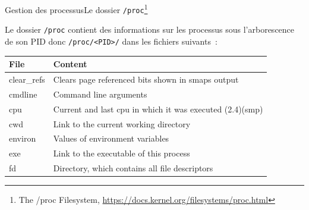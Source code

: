 \documentclass{beamer}
\begin{document}
    \begin{frame}{Gestion des processus}{Le dossier \lstinline{/proc}\footnote{The /proc Filesystem, \url{https://docs.kernel.org/filesystems/proc.html}}}
        \begin{footnotesize}
            Le dossier \lstinline{/proc} contient des informations sur les processus sous l'arborescence de son PID donc \lstinline{/proc/<PID>/} dans les fichiers suivants~:
            \begin{tiny}
                \begin{table}[h!]
                    \centering
                    \begin{tabular}{|p{1.5cm}|p{9cm}|}
                        \hline
                        \textbf{File} & \textbf{Content}                                                                                                            \\
                        \hline
                        clear\_refs   & Clears page referenced bits shown in smaps output                                                                           \\
                        \hline
                        cmdline       & Command line arguments                                                                                                      \\
                        \hline
                        cpu           & Current and last cpu in which it was executed (2.4)(smp)                                                                    \\
                        \hline
                        cwd           & Link to the current working directory                                                                                       \\
                        \hline
                        environ       & Values of environment variables                                                                                             \\
                        \hline
                        exe           & Link to the executable of this process                                                                                      \\
                        \hline
                        fd            & Directory, which contains all file descriptors                                                                              \\

\end{tabular}
\end{table}
\end{tiny}
\end{footnotesize}
\end{frame}
\end{document}

